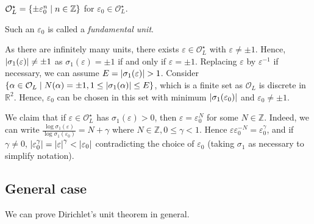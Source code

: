 \begin{corollary}
    \( \mathcal O_L^\star = \qty{\pm \varepsilon_0^n \mid n \in \mathbb Z} \) for \( \varepsilon_0 \in \mathcal O_L^\star \).
\end{corollary}
Such an \( \varepsilon_0 \) is called a \emph{fundamental unit}.
\begin{remark}
    As there are infinitely many units, there exists \( \varepsilon \in \mathcal O_L^\star \) with \( \varepsilon \neq \pm 1 \).
    Hence, \( \abs{\sigma_1(\varepsilon)} \neq \pm 1 \) as \( \sigma_1(\varepsilon) = \pm 1 \) if and only if \( \varepsilon = \pm 1 \).
    Replacing \( \varepsilon \) by \( \varepsilon^{-1} \) if necessary, we can assume \( E = \abs{\sigma_1(\varepsilon)} > 1 \).
    Consider \( \qty{\alpha \in \mathcal O_L \mid N(\alpha) = \pm 1, 1 \leq \abs{\sigma_1(\alpha)} \leq E} \), which is a finite set as \( \mathcal O_L \) is discrete in \( \mathbb R^2 \).
    Hence, \( \varepsilon_0 \) can be chosen in this set with minimum \( \abs{\sigma_1(\varepsilon_0)} \) and \( \varepsilon_0 \neq \pm 1 \).

    We claim that if \( \varepsilon \in \mathcal O_L^\star \) has \( \sigma_1(\varepsilon) > 0 \), then \( \varepsilon = \varepsilon_0^N \) for some \( N \in \mathbb Z \).
    Indeed, we can write \( \frac{\log \sigma_1(\varepsilon)}{\log \sigma_1(\varepsilon_0)} = N + \gamma \) where \( N \in \mathbb Z, 0 \leq \gamma < 1 \).
    Hence \( \varepsilon \varepsilon_0^{-N} = \varepsilon_0^\gamma \), and if \( \gamma \neq 0 \), \( \abs{\varepsilon_0^\gamma} = \abs{\varepsilon}^\gamma < \abs{\varepsilon_0} \) contradicting the choice of \( \varepsilon_0 \) (taking \( \sigma_1 \) as necessary to simplify notation).
\end{remark}

\subsection{General case}
We can prove Dirichlet's unit theorem in general.

